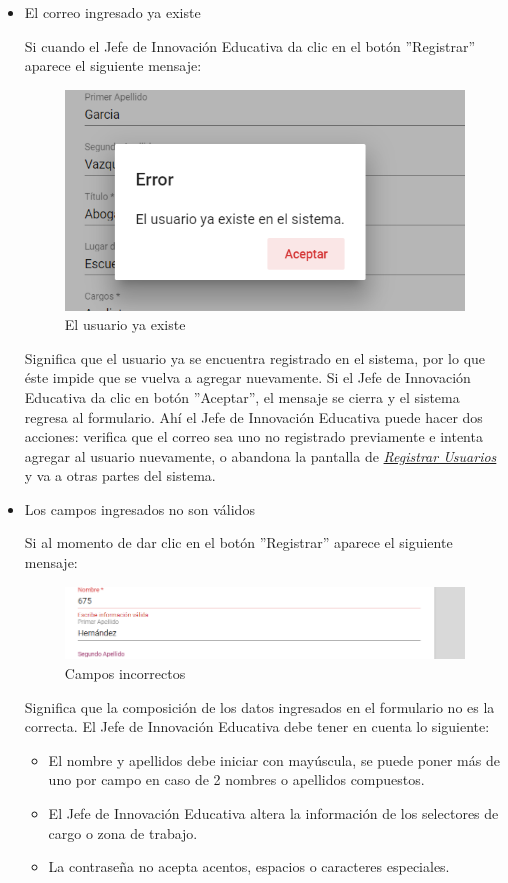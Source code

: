 \begin{itemize}
	\item El correo ingresado ya existe

	Si cuando el Jefe de Innovación Educativa da clic en el botón ''Registrar'' aparece el siguiente mensaje:

	\begin{figure}[H]
		\centering
		\includegraphics[width=0.4\linewidth]{images/SP5/MSG36}
		\caption{El usuario ya existe}
		\label{mensaje36-JIE}

	\end{figure}

	Significa que el usuario ya se encuentra registrado en el sistema, por lo que éste impide que se vuelva a agregar nuevamente. Si el Jefe de Innovación Educativa da clic en botón ''Aceptar'', el mensaje se cierra y el sistema regresa al formulario. Ahí el Jefe de Innovación Educativa  puede hacer dos acciones: verifica que el correo sea uno no registrado previamente e intenta agregar al usuario nuevamente, o abandona la pantalla de \hyperlink{registrarUs-JIE}{\textit{Registrar Usuarios}} y va a otras partes del sistema.
	
	\item Los campos ingresados no son válidos

	Si al momento de dar clic en el botón ''Registrar'' aparece el siguiente mensaje:
	\begin{figure}[H]
		\centering
		\includegraphics[width=0.4\linewidth]{images/SP5/MSG35}
		\caption{Campos incorrectos}
		\label{mensaje35-JIE}

	\end{figure}

	Significa que la composición de los datos ingresados en el formulario no es la correcta. El Jefe de Innovación Educativa debe tener en cuenta lo siguiente:

	\begin{itemize}
		\item El nombre y apellidos debe iniciar con mayúscula, se puede poner más de uno por campo en caso de 2 nombres o apellidos compuestos.
		\item El Jefe de Innovación Educativa altera la información de los selectores de cargo o zona de trabajo.
		\item La contraseña no acepta acentos, espacios o caracteres especiales.
	\end{itemize}

\end{itemize}

